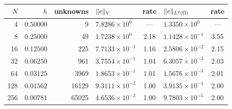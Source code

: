 \begin{tabular}{@{}rrrlclc@{}}
\toprule
$N$ & $h$ & unknowns & $\lVert e\rVert_{V}$ & rate & $\lVert e\rVert_{L^{2}(\Omega)}$ & rate\\
\midrule
4 & $0.50000$ & 9 & $7.8286\!\times\!10^{0}$ & --- & $1.3350\!\times\!10^{0}$ & ---\\
8 & $0.25000$ & 49 & $1.7238\!\times\!10^{0}$ & 2.18 & $1.1428\!\times\!10^{-1}$ & 3.55\\
16 & $0.12500$ & 225 & $7.7133\!\times\!10^{-1}$ & 1.16 & $2.5806\!\times\!10^{-2}$ & 2.15\\
32 & $0.06250$ & 961 & $3.7554\!\times\!10^{-1}$ & 1.04 & $6.3057\!\times\!10^{-3}$ & 2.03\\
64 & $0.03125$ & 3969 & $1.8653\!\times\!10^{-1}$ & 1.01 & $1.5676\!\times\!10^{-3}$ & 2.01\\
128 & $0.01562$ & 16129 & $9.3111\!\times\!10^{-2}$ & 1.00 & $3.9135\!\times\!10^{-4}$ & 2.00\\
256 & $0.00781$ & 65025 & $4.6536\!\times\!10^{-2}$ & 1.00 & $9.7803\!\times\!10^{-5}$ & 2.00\\
\bottomrule
\end{tabular}

